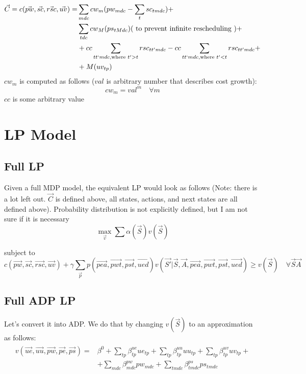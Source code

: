 \documentclass{article}
\begin{document}
\begin{align} \begin{split}  
	\vec{C} = c(\vec{pw}, \vec{sc}, \vec{rsc}, \vec{uv}) = 
		& \sum_{mdc} cw_{m} (pw_{mdc} - \sum_{t} sc_{tmdc}) +  \\
		& \sum_{tdc} cw_{M} (ps_{tMdc}) (\text{ to prevent infinite rescheduling })+ \\
		& + cc \sum_{tt`mdc, \text{where } t' > t} rsc_{tt'mdc} - cc \sum_{tt`mdc, \text{where } t' < t} rsc_{tt'mdc} + \\ 
		& + M (uv_{tp})
\end{split} \end{align} 
$cw_{m}$ is computed as follows ($val$ is arbitrary number that describes cost growth):
	\begin{equation}  cw_{m} = val^m \quad \forall m \end{equation} 
$cc$ is some arbitrary value

\section{LP Model}

\subsection{Full LP} 
Given a full MDP model, the equivalent LP would look as follows 
(Note: there is a lot left out. $\vec{C}$ is defined above, all states, actions, and next states are all defined above). Probability distribution is not explicitly defined, but I am not sure if it is necessary
\begin{equation}
	\max_{\vec{v}} \sum \alpha (\vec{S}) v(\vec{S}) 
\end{equation}

subject to
\begin{equation}
	c(\vec{pw}, \vec{sc}, \vec{rsc}, \vec{uv}) + \gamma \sum_{\vec{p}} p(\vec{pea}, \vec{pwt}, \vec{pst}, \vec{ued}) v( \vec{S'} | \vec{S}, \vec{A}, \vec{pea}, \vec{pwt}, \vec{pst}, \vec{ued}) \ge v(\vec{S}) \quad \forall \vec{S} \vec{A}
\end{equation}

\subsection{Full ADP LP }
Let's convert it into ADP. We do that by changing $v(\vec{S})$ to an approximation as follows:
\begin{align} \begin{split}
	v(\vec{ue}, \vec{uu}, \vec{pw}, \vec{pe}, \vec{ps}) =  & \beta^0 +
		\sum_{tp} \beta_{tp}^{ue} ue_{tp} +
		\sum_{tp} \beta_{tp}^{uu} uu_{tp} + 
		\sum_{tp} \beta_{tp}^{uv} uv_{tp} + \\
		& + \sum_{mdc} \beta_{mdc}^{pw} pw_{mdc}  + 
		\sum_{tmdc} \beta_{tmdc}^{ps} ps_{tmdc}
\end{split} \end{align}
\end{document}
